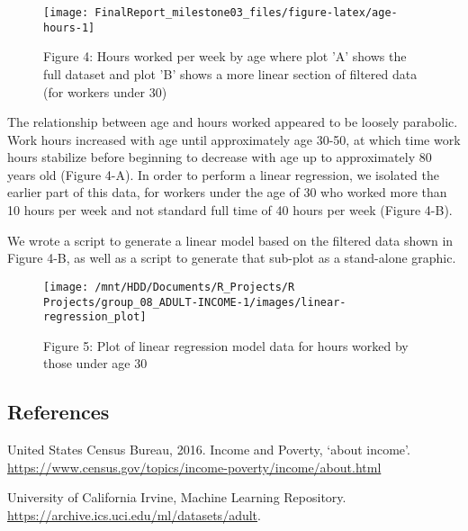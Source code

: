 \documentclass[]{article}
\begin{document}
\begin{figure}

{\centering \texttt{[image: FinalReport\_milestone03\_files/figure-latex/age-hours-1]} 

}

\caption{Figure 4: Hours worked per week by age where plot 'A' shows the full dataset and plot 'B' shows a more linear section of filtered data (for workers under 30)}\label{fig:age-hours}
\end{figure}

The relationship between age and hours worked appeared to be loosely
parabolic. Work hours increased with age until approximately age 30-50,
at which time work hours stabilize before beginning to decrease with age
up to approximately 80 years old (Figure 4-A). In order to perform a
linear regression, we isolated the earlier part of this data, for
workers under the age of 30 who worked more than 10 hours per week and
not standard full time of 40 hours per week (Figure 4-B).

We wrote a script to generate a linear model based on the filtered data
shown in Figure 4-B, as well as a script to generate that sub-plot as a
stand-alone graphic.

\begin{figure}

{\centering \texttt{[image: /mnt/HDD/Documents/R\_Projects/R Projects/group\_08\_ADULT-INCOME-1/images/linear-regression\_plot]} 

}

\caption{Figure 5: Plot of linear regression model data for hours worked by those under age 30}\label{fig:age-hrs-plot}
\end{figure}

\hypertarget{references}{%
\subsection{References}\label{references}}

United States Census Bureau, 2016. Income and Poverty, `about income'.
\url{https://www.census.gov/topics/income-poverty/income/about.html}

University of California Irvine, Machine Learning Repository.
\url{https://archive.ics.uci.edu/ml/datasets/adult}.
\end{document}
